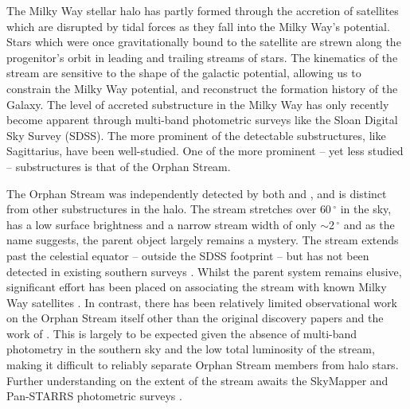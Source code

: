 \documentclass[10pt,apjl]{emulateapj}
\begin{document}
The Milky Way stellar halo has partly formed through the accretion of satellites which are disrupted by tidal forces as they fall into the Milky Way's potential. Stars which were once gravitationally bound to the satellite are strewn along the progenitor's orbit in leading and trailing streams of stars. The kinematics of the stream are sensitive to the shape of the galactic potential, allowing us to constrain the Milky Way potential, and reconstruct the formation history of the Galaxy. The level of accreted substructure in the Milky Way has only recently become apparent through multi-band photometric surveys like the Sloan Digital Sky Survey (SDSS). The more prominent of the detectable substructures, like Sagittarius, have been well-studied. One of the more prominent \--- yet less studied \--- substructures is that of the Orphan Stream. 

The Orphan Stream was independently detected by both \citet{Grillmair_2006} and \citet{Belokurov_et-al_2006}, and is distinct from other substructures in the halo. The stream stretches over $60\,^\circ$ in the sky, has a low surface brightness and a narrow stream width of only $\sim$2\,$^\circ$ and as the name suggests, the parent object largely remains a mystery. The stream extends past the celestial equator \--- outside the SDSS footprint \--- but has not been detected in existing southern surveys \citep{Newberg_et-al_2010}. Whilst the parent system remains elusive, significant effort has been placed on associating the stream with known Milky Way satellites \citep{Zucker_et-al_2006, Fellhaur_et-al_2007,Jin_Lynden_Bell_2007,Sales_et-al_2008}. In contrast, there has been relatively limited observational work on the Orphan Stream itself other than the original discovery papers \citep{Grillmair_Dionatos_2006, Belokurov_et-al_2006, Belokurov_et-al_2007} and the work of \citet{Newberg_et-al_2010}. This is largely to be expected given the absence of multi-band photometry in the southern sky and the low total luminosity of the stream, making it difficult to reliably separate Orphan Stream members from halo stars. Further understanding on the extent of the stream awaits the SkyMapper and Pan-STARRS photometric surveys \citep{Keller_et-al_2007, Hodapp_et-al_2004}.
\end{document}

